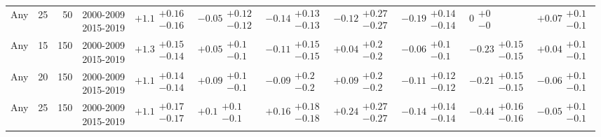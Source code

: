 \begin{table}[H]
\begin{tabular}{lrrllllllll}
Any & 25 & 50 & \makecell{2000-2009 \\ 2015-2019} & $\bm{+1.1}\substack{+0.16 \\ -0.16}$ & $-0.05\substack{+0.12 \\ -0.12}$ & $\bm{-0.14}\substack{+0.13 \\ -0.13}$ & $-0.12\substack{+0.27 \\ -0.27}$ & $\bm{-0.19}\substack{+0.14 \\ -0.14}$ & $0\substack{+0 \\ -0}$ & $+0.07\substack{+0.1 \\ -0.1}$ \\
Any & 15 & 150 & \makecell{2000-2009 \\ 2015-2019} & $\bm{+1.3}\substack{+0.15 \\ -0.14}$ & $+0.05\substack{+0.1 \\ -0.1}$ & $-0.11\substack{+0.15 \\ -0.15}$ & $+0.04\substack{+0.2 \\ -0.2}$ & $-0.06\substack{+0.1 \\ -0.1}$ & $\bm{-0.23}\substack{+0.15 \\ -0.15}$ & $+0.04\substack{+0.1 \\ -0.1}$ \\
Any & 20 & 150 & \makecell{2000-2009 \\ 2015-2019} & $\bm{+1.1}\substack{+0.14 \\ -0.14}$ & $+0.09\substack{+0.1 \\ -0.1}$ & $-0.09\substack{+0.2 \\ -0.2}$ & $+0.09\substack{+0.2 \\ -0.2}$ & $-0.11\substack{+0.12 \\ -0.12}$ & $\bm{-0.21}\substack{+0.15 \\ -0.15}$ & $-0.06\substack{+0.1 \\ -0.1}$ \\
Any & 25 & 150 & \makecell{2000-2009 \\ 2015-2019} & $\bm{+1.1}\substack{+0.17 \\ -0.17}$ & $+0.1\substack{+0.1 \\ -0.1}$ & $+0.16\substack{+0.18 \\ -0.18}$ & $+0.24\substack{+0.27 \\ -0.27}$ & $\bm{-0.14}\substack{+0.14 \\ -0.14}$ & $\bm{-0.44}\substack{+0.16 \\ -0.16}$ & $-0.05\substack{+0.1 \\ -0.1}$ \\
\bottomrule
\end{tabular}\normalsize\renewcommand{\arraystretch}{1}
\end{table}


